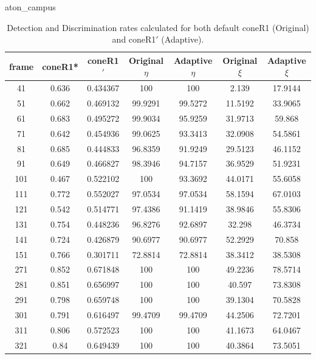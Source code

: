 \begin{appendices}
\begin{table}
\centering
\caption{aton\_campus}
\caption*{Detection and Discrimination rates calculated for both default coneR1 (Original) and coneR1$'$ (Adaptive).}
\begin{tabular}{ |c|c|c|c|c|c|c| }
\hline
\textbf{frame} &  \textbf{coneR1*} &  \textbf{coneR1$'$} &  \textbf{Original $\eta$} &  \textbf{Adaptive $\eta$} &  \textbf{Original $\xi$} &  \textbf{Adaptive $\xi$} \\
\hline
\hline
41 &  0.636 &  0.434367 &  100 &  100 &  2.139 &  17.9144 \\
\hline
51 &  0.662 &  0.469132 &  99.9291 &  99.5272 &  11.5192 &  33.9065 \\
\hline
61 &  0.683 &  0.495272 &  99.9034 &  95.9259 &  31.9713 &  59.868 \\
\hline
71 &  0.642 &  0.454936 &  99.0625 &  93.3413 &  32.0908 &  54.5861 \\
\hline
81 &  0.685 &  0.444833 &  96.8359 &  91.9249 &  29.5123 &  46.1152 \\
\hline
91 &  0.649 &  0.466827 &  98.3946 &  94.7157 &  36.9529 &  51.9231 \\
\hline
101 &  0.467 &  0.522102 &  100 &  93.3692 &  44.0171 &  55.6058 \\
\hline
111 &  0.772 &  0.552027 &  97.0534 &  97.0534 &  58.1594 &  67.0103 \\
\hline
121 &  0.542 &  0.514771 &  97.4386 &  91.1419 &  38.9846 &  55.8306 \\
\hline
131 &  0.754 &  0.448236 &  96.8276 &  92.6897 &  32.298 &  46.3734 \\
\hline
141 &  0.724 &  0.426879 &  90.6977 &  90.6977 &  52.2929 &  70.858 \\
\hline
151 &  0.766 &  0.301711 &  72.8814 &  72.8814 &  38.3412 &  38.5308 \\
\hline
271 &  0.852 &  0.671848 &  100 &  100 &  49.2236 &  78.5714 \\
\hline
281 &  0.851 &  0.656997 &  100 &  100 &  40.597 &  73.8308 \\
\hline
291 &  0.798 &  0.659748 &  100 &  100 &  39.1304 &  70.5828 \\
\hline
301 &  0.791 &  0.616497 &  99.4709 &  99.4709 &  44.2506 &  72.7201 \\
\hline
311 &  0.806 &  0.572523 &  100 &  100 &  41.1673 &  64.0467 \\
\hline
321 &  0.84 &  0.649439 &  100 &  100 &  40.3864 &  73.5051 \\

\end{tabular}
\end{table}
\end{appendices}
